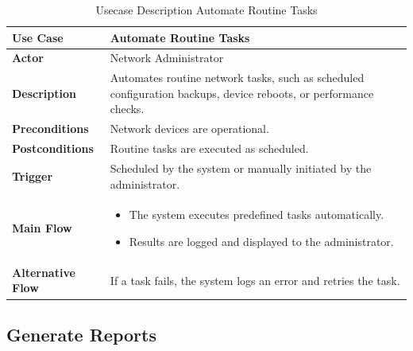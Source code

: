 \begin{table}[H]
    \centering
    \caption{Usecase Description Automate Routine Tasks}
    \renewcommand{\arraystretch}{1.3}
    \begin{tabular}{|p{3cm}|p{11cm}|}
        \hline
        \textbf{Use Case} & \textbf{Automate Routine Tasks} \\
        \hline
        \textbf{Actor} & Network Administrator \\
        \hline
        \textbf{Description} & Automates routine network tasks, such as scheduled configuration backups, device reboots, or performance checks. \\
        \hline
        \textbf{Preconditions} & Network devices are operational. \\
        \hline
        \textbf{Postconditions} & Routine tasks are executed as scheduled. \\
        \hline
        \textbf{Trigger} & Scheduled by the system or manually initiated by the administrator. \\
        \hline
        \textbf{Main Flow} & 
        \begin{itemize}
            \item The system executes predefined tasks automatically.
            \item Results are logged and displayed to the administrator.
        \end{itemize} \\
        \hline
        \textbf{Alternative Flow} & If a task fails, the system logs an error and retries the task. \\
        \hline
    \end{tabular}
\end{table}

\subsection{Generate Reports}


